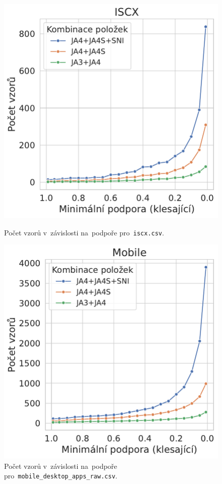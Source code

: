 \begin{figure}[H]
	\centering
	\begin{minipage}[t]{0.49\textwidth}
		\centering
		\includegraphics[width=\linewidth]{obrazky-figures/exps/ex2-num_patterns-iscx.pdf}
		\caption{Počet vzorů v~závislosti na~podpoře pro~\texttt{iscx.csv}.}
		\label{fig:ex2-iscx-patterns}
	\end{minipage}%
	\hfill
	\begin{minipage}[t]{0.49\textwidth}
		\centering
		\includegraphics[width=\linewidth]{obrazky-figures/exps/ex2-num_patterns-mobile.pdf}
		\caption{Počet vzorů v~závislosti na~podpoře pro~\texttt{mobile\_desktop\_apps\_raw.csv}.}
		\label{fig:ex2-mobile-patterns}
	\end{minipage}
\end{figure}

